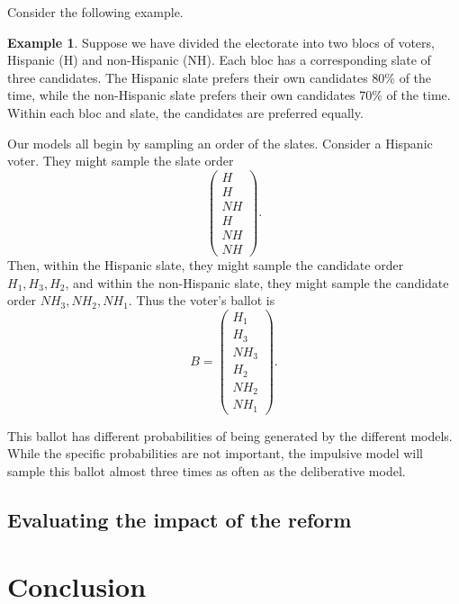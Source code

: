 \documentclass{amsart}
\theoremstyle{definition}
\newtheorem{example}{Example}
\begin{document}
Consider the following example.
\begin{example}
Suppose we have divided the electorate into two blocs of voters, Hispanic (H) and non-Hispanic (NH).
Each bloc has a corresponding slate of three candidates.
The Hispanic slate prefers their own candidates 80\% of the time, while the non-Hispanic slate 
prefers their own candidates 70\% of the time.
Within each bloc and slate, the candidates are preferred equally.

Our models all begin by sampling an order of the slates. Consider a Hispanic voter. 
They might sample the slate order 
\[\begin{pmatrix}
    H\\
     H\\
     NH\\
     H\\
     NH\\
     NH
\end{pmatrix}.\]
Then, within the Hispanic slate, they might sample the candidate order $H_1, H_3, H_2$, 
and within the non-Hispanic slate, they might sample the candidate order $NH_3, NH_2, NH_1$.
Thus the voter's ballot is 
\[B = \begin{pmatrix}
    H_1\\
    H_3\\
    NH_3\\
    H_2\\
    NH_2\\
    NH_1
\end{pmatrix}.\]

This ballot has different probabilities of being generated by the different models.
While the specific probabilities are not important, the impulsive model will sample this ballot
almost three times as often as the deliberative model.


\end{example}

\subsection{Evaluating the impact of the reform}

\section{Conclusion}
\end{document}
